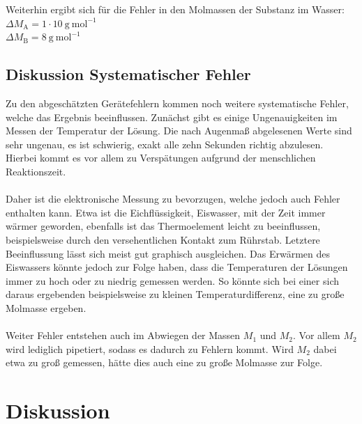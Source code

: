 \documentclass[12pt,a4paper,titlepage,headinclude,bibtotoc]{scrartcl}
\begin{document}
Weiterhin ergibt sich für die Fehler in den Molmassen der Substanz im Wasser:\\
$\Delta M_\mathrm{A} = 1 \cdot 10 {~}\mathrm{g{~}mol^{-1}} $\\
$\Delta M_\mathrm{B} = 8 {~}\mathrm{g{~}mol^{-1}}$\\

\subsection{Diskussion Systematischer Fehler}
Zu den abgeschätzten Gerätefehlern kommen noch weitere systematische Fehler, welche das Ergebnis beeinflussen. Zunächst gibt es einige Ungenauigkeiten im Messen der Temperatur der Lösung. Die nach Augenmaß abgelesenen Werte sind sehr ungenau, es ist schwierig, exakt alle zehn Sekunden richtig abzulesen. Hierbei kommt es vor allem zu Verspätungen aufgrund der menschlichen Reaktionszeit.\\\\ Daher ist die elektronische Messung zu bevorzugen, welche jedoch auch Fehler enthalten kann. Etwa ist die Eichflüssigkeit, Eiswasser, mit der Zeit immer wärmer geworden, ebenfalls ist das Thermoelement leicht zu beeinflussen, beispielsweise durch den versehentlichen Kontakt zum Rührstab. Letztere Beeinflussung lässt sich meist gut graphisch ausgleichen. Das Erwärmen des Eiswassers könnte jedoch zur Folge haben, dass die Temperaturen der Lösungen immer zu hoch oder zu niedrig gemessen werden. So könnte sich bei einer sich daraus ergebenden beispielsweise zu kleinen Temperaturdifferenz, eine zu große Molmasse ergeben.\\\\
Weiter Fehler entstehen auch im Abwiegen der Massen $M_1$ und $M_2$. Vor allem $M_2$ wird lediglich pipetiert, sodass es dadurch zu Fehlern kommt. Wird $M_2$ dabei etwa zu groß gemessen, hätte dies auch eine zu große Molmasse zur Folge.

\section{Diskussion}
\end{document}
